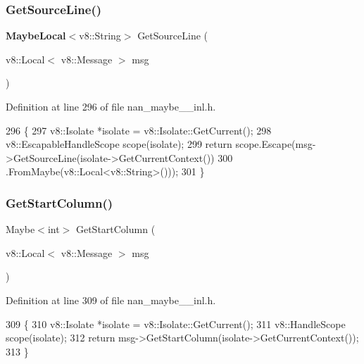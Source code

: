 \subsubsection{Get\+Source\+Line()}
{\footnotesize\ttfamily \textbf{ Maybe\+Local}$<$v8\+::\+String$>$ Get\+Source\+Line (\begin{DoxyParamCaption}\item[{v8\+::\+Local$<$ v8\+::\+Message $>$}]{msg }\end{DoxyParamCaption})}



Definition at line 296 of file nan\+\_\+maybe\+\_\+\_\+inl.\+h.


\begin{DoxyCode}
296                                                            \{
297   v8::Isolate *isolate = v8::Isolate::GetCurrent();
298   v8::EscapableHandleScope scope(isolate);
299   \textcolor{keywordflow}{return} scope.Escape(msg->GetSourceLine(isolate->GetCurrentContext())
300                           .FromMaybe(v8::Local<v8::String>()));
301 \}
\end{DoxyCode}
\mbox{\label{nan__maybe__43__inl_8h_a05943f7eb21051a05d3a8a1adb3e4eaf}} 
\subsubsection{Get\+Start\+Column()}
{\footnotesize\ttfamily Maybe$<$int$>$ Get\+Start\+Column (\begin{DoxyParamCaption}\item[{v8\+::\+Local$<$ v8\+::\+Message $>$}]{msg }\end{DoxyParamCaption})}



Definition at line 309 of file nan\+\_\+maybe\+\_\+\_\+inl.\+h.


\begin{DoxyCode}
309                                                          \{
310   v8::Isolate *isolate = v8::Isolate::GetCurrent();
311   v8::HandleScope scope(isolate);
312   \textcolor{keywordflow}{return} msg->GetStartColumn(isolate->GetCurrentContext());
313 \}
\end{DoxyCode}
\mbox{\label{nan__maybe__43__inl_8h_ac1946b683ef0de1bbebadbb83b3a4803}} 
